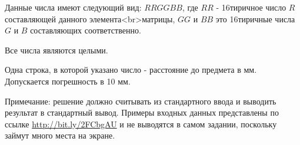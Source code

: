 Данные числа имеют следующий вид: $RRGGBB$, где $RR$ - 16тиричное число $R$ составляющей данного элемента<br>матрицы, $GG$ и $BB$ это 16тиричные числа $G$ и $B$ составляющих соответственно.

Все числа являются целыми.

\outputfmtSection

Одна строка, в которой указано число - расстояние до предмета в мм. Допускается погрешность в 10 мм.

Примечание: решение должно считывать из стандартного ввода и выводить результат в стандартный вывод. Примеры входных данных представлены по ссылке 
\url{http://bit.ly/2FCbgAU} и не выводятся в самом задании, поскольку займут много места на экране.

